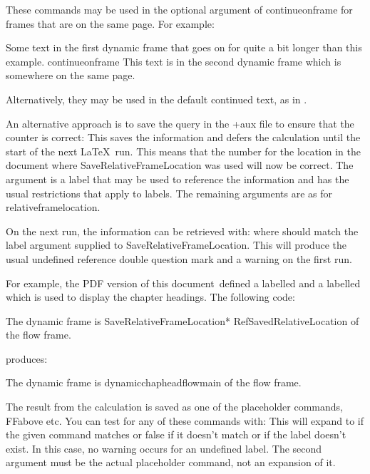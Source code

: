 \documentclass[fontsize=12pt]{scrbook}
\newcommand\thisdoc{the PDF version of this document}
\newcommand\thisdoc{this document}
\begin{document}
These commands may be used in the optional argument of 
\gls{continueonframe} for frames that are on the same page.
For example:
\begin{codebox}[before upper app=\small]
Some text in the first dynamic frame that goes on for 
quite a bit longer than this example.
\gls{continueonframe}
This text is in the second dynamic frame which is 
somewhere on the same page.
\end{codebox}
Alternatively, they may be used in the default continued text, as in
.

An alternative approach is to save the query in the \ext+{aux} file
to ensure that the  counter is correct:
This saves the information and defers the calculation until the start of the 
next \LaTeX\ run. This means that the  number for
the location in the document where \gls{SaveRelativeFrameLocation}
was used will now be correct. The  argument is a label that may be used to
reference the information and has the usual restrictions that apply
to labels. The remaining arguments are as for \gls{relativeframelocation}.

On the next run, the information can be retrieved with:
where  should match the label argument supplied to 
\gls{SaveRelativeFrameLocation}.
This will produce the usual undefined reference double question mark  and 
a warning on the first run.

For example, \thisdoc\ defined a 
 labelled  and a 
 labelled  which is
used to display the chapter headings. The following code:
\begin{codebox}
The dynamic frame is 
\gls{SaveRelativeFrameLocation}*
\gls{RefSavedRelativeLocation}
of the flow frame.
\end{codebox}
produces:
\begin{resultbox}
The dynamic frame is 
%
 {dynamic}{chaphead}{flow}{main}%
of the flow frame.
\end{resultbox}

The result from the calculation is saved as one of the placeholder
commands, \gls{FFabove} etc. You can test for any of these commands
with:
This will expand to  if the given command matches or
false if it doesn't match or if the label doesn't exist. In this
case, no warning occurs for an undefined label. The second argument
must be the actual placeholder command, not an expansion of it.
\end{document}
